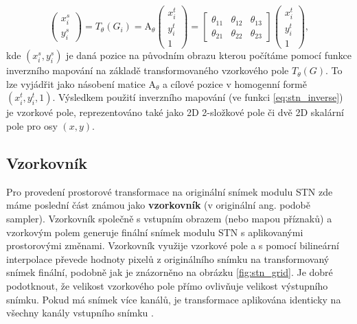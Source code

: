 \begin{equation}
\begin{pmatrix}
x_i^s \\
y_i^s
\end{pmatrix}
= T_{\theta}(G_i) = {\displaystyle \mathrm {A} }_\theta
\begin{pmatrix}
x_i^t \\
y_i^t \\
1
\end{pmatrix}
= 
\begin{bmatrix}
\theta_{11} & \theta_{12} & \theta_{13} \\
\theta_{21} & \theta_{22} & \theta_{23}
\end{bmatrix}
\begin{pmatrix}
x_i^t \\
y_i^t \\
1
\end{pmatrix},
\label{eq:stn_inverse}
\end{equation}
kde $(x_i^s, y_i^s)$ je daná pozice na původním obrazu kterou počítáme pomocí funkce inverzního mapování na základě transformovaného vzorkového pole $T_{\theta}(G)$. To lze vyjádřit jako násobení matice ${\displaystyle \mathrm {A} }_\theta$ a cílové pozice v homogenní formě $(x_i^t, y_i^t, 1)$. Výsledkem použití inverzního mapování (ve funkci \ref{eq:stn_inverse}) je vzorkové pole, reprezentováno také jako 2D 2-složkové pole či dvě 2D skalární pole pro osy $(x, y)$.

\subsection{Vzorkovník}

Pro provedení prostorové transformace na originální snímek modulu STN zde máme poslední část známou jako \textbf{vzorkovník} (v originální ang. podobě sampler). Vzorkovník společně s vstupním obrazem (nebo mapou příznaků) a vzorkovým polem generuje finální snímek modulu STN s aplikovanými prostorovými změnami. Vzorkovník využije vzorkové pole a s pomocí bilineární interpolace převede hodnoty pixelů z originálního snímku na transformovaný snímek finální, podobně jak je znázorněno na obrázku \ref{fig:stn_grid}. Je dobré podotknout, že velikost vzorkového pole přímo ovlivňuje velikost výstupního snímku. Pokud má snímek více kanálů, je transformace aplikována identicky na všechny kanály vstupního snímku \cite{stn_medium_3}.

